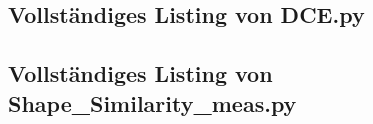 \subsection{Vollständiges Listing von DCE.py}{
    }

\subsection{ Vollständiges Listing von Shape\_Similarity\_meas.py}{
    
}


